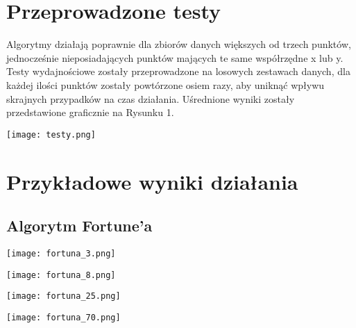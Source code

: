 \documentclass{article}
\begin{document}
\section{Przeprowadzone testy}
Algorytmy działają poprawnie dla zbiorów danych większych od trzech punktów, jednocześnie nieposiadających punktów mających te same współrzędne x lub y.
\newline
Testy wydajnościowe zostały przeprowadzone na losowych zestawach danych, dla każdej ilości punktów zostały powtórzone osiem razy, aby uniknąć wpływu skrajnych przypadków na czas działania. Uśrednione wyniki zostały przedstawione graficznie na Rysunku 1.
\newline
\newline

\begin{minipackage}{\linewidth}
            \centering
            \texttt{[image: testy.png]}
        \end{minipackage}
        

\section{Przykładowe wyniki działania}
\subsection{Algorytm Fortune'a}
        \begin{minipackage}{\linewidth}
            \centering
            \texttt{[image: fortuna\_3.png]}
        \end{minipackage}
        \begin{minipackage}{\linewidth}
            \centering
            \texttt{[image: fortuna\_8.png]}
        \end{minipackage}
        \begin{minipackage}{\linewidth}
            \centering
            \texttt{[image: fortuna\_25.png]}
        \end{minipackage}
        \begin{minipackage}{\linewidth}
            \centering
            \texttt{[image: fortuna\_70.png]}
        \end{minipackage}
\end{document}
